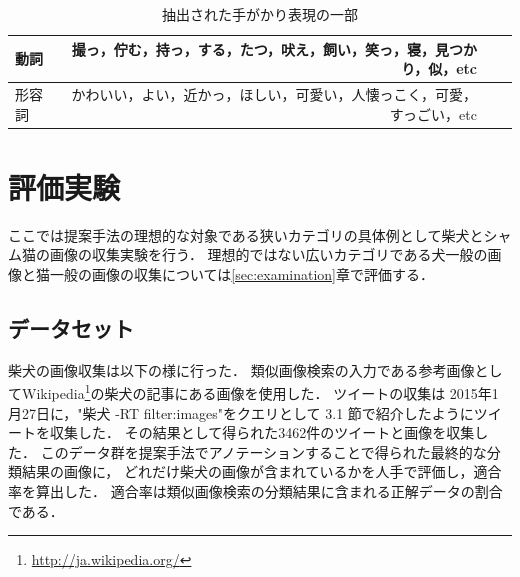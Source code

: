 
\begin{table}[bt]
\begin{center}
\caption{抽出された手がかり表現の一部}
\label{tab:predicate}
\begin{tabular}{|l|r|r|r|}\hline
動詞& 撮っ，佇む，持っ，する，たつ，吠え，飼い，笑っ，寝，見つかり，似，etc \\ \hline
形容詞& かわいい，よい，近かっ，ほしい，可愛い，人懐っこく，可愛，すっごい，etc \\ \hline
\end{tabular}
\end{center}
\end{table}



\chapter{評価実験}
\label{sec:experiment}

ここでは提案手法の理想的な対象である狭いカテゴリの具体例として柴犬とシャム猫の画像の収集実験を行う．
理想的ではない広いカテゴリである犬一般の画像と猫一般の画像の収集については\ref{sec:examination}章で評価する．

\section{データセット}


柴犬の画像収集は以下の様に行った．
類似画像検索の入力である参考画像としてWikipedia\footnote{\url{http://ja.wikipedia.org/}}の柴犬の記事にある画像を使用した．
ツイートの収集は
2015年1月27日に，"柴犬 -RT filter:images"をクエリとして
3.1
節で紹介したようにツイートを収集した．
その結果として得られた3462件のツイートと画像を収集した．
このデータ群を提案手法でアノテーションすることで得られた最終的な分類結果の画像に，
どれだけ柴犬の画像が含まれているかを人手で評価し，適合率を算出した．
適合率は類似画像検索の分類結果に含まれる正解データの割合である．

